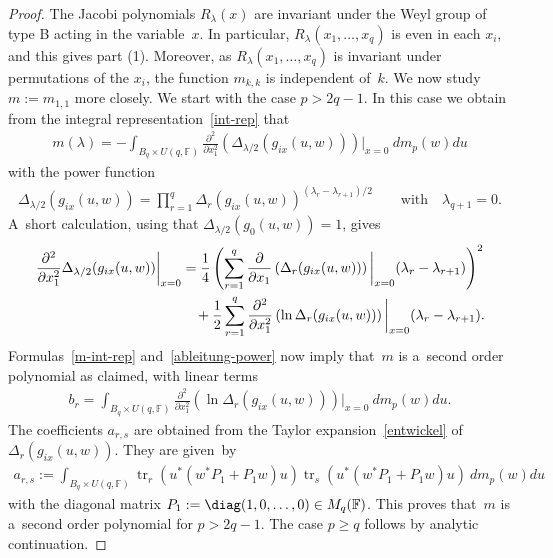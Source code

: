 \begin{proof}
The Jacobi polynomials $R_\lambda(x)$ are invariant under the Weyl group of type B acting in the variable~$x$.
In particular, $R_\lambda(x_1,\ldots,x_q)$ is even in each $x_i$, and this gives part (1).
Moreover, as $R_\lambda(x_1,\ldots,x_q)$ is invariant under permutations of the $x_i$, the function $m_{k,k}$ is
independent of~$k$.
We now study $m:=m_{1,1}$ more closely.
We start with the case $p> 2q-1$.
In this case we obtain from the integral representation~\eqref{int-rep} that
\begin{gather}
\label{m-int-rep}
m(\lambda)= -\int_{B_q\times U(q,\mathbb F)} \frac{\partial^2}{\partial x_1^2}\left(\Delta_{\lambda/2}(g_{ix}(u,w))\right)\bigg|_{x=0}\> dm_p(w)du
\end{gather}
with the power function
\begin{gather*}
\Delta_{\lambda/2}(g_{ix}(u,w)) =\prod\limits_{r=1}^q \Delta_r(g_{ix}(u,w))^{(\lambda_r-\lambda_{r+1})/2}
\qquad
\text{with}
\quad
\lambda_{q+1}=0.
\end{gather*}
A~short calculation, using that $\Delta_{\lambda/2}(g_0(u,w))=1$, gives
\begin{gather}
\frac{\partial^2}{\partial x_1^2} \Delta_{\lambda/2}(g_{ix}(u,w))\bigg|_{x=0}
=\frac{1}{4} \left(\sum\limits_{r=1}^q\frac{\partial}{\partial x_1}\left(\Delta_r(g_{ix}(u,w))\right)\bigg|_{x=0}
 (\lambda_r-\lambda_{r+1})\right)^2
\nonumber
\\
\hphantom{\frac{\partial^2}{\partial x_1^2} \Delta_{\lambda/2}(g_{ix}(u,w))\bigg|_{x=0}=}{}
+\frac{1}{2}\sum\limits_{r=1}^q \frac{\partial^2}{\partial x_1^2} \left(\ln \Delta_r(g_{ix}(u,w))\right)\bigg|_{x=0}
  (\lambda_r-\lambda_{r+1}).
\label{ableitung-power}
\end{gather}
Formulas~\eqref{m-int-rep} and~\eqref{ableitung-power} now imply that~$m$ is a~second order polynomial as claimed, with
linear terms
\begin{gather*}
b_r= \int_{B_q\times U(q,\mathbb F)} \frac{\partial^2}{\partial x_1^2} \left(\ln\Delta_r(g_{ix}(u,w))\right)\bigg|_{x=0}\> dm_p(w)du.
\end{gather*}
The coef\/f\/icients $a_{r,s}$ are obtained from the Taylor expansion~\eqref{entwickel} of $\Delta_r(g_{ix}(u,w))$. They are
given~by
\begin{gather}
\label{a_rs}
a_{r,s}:= \int_{B_q\times U(q,\mathbb F)} \operatorname{tr}_r(u^{*}(w^*P_1+ P_1  w)u) \operatorname{tr}_s(u^{*}(w^*P_1+ P_1  w)u)\>dm_p(w)du
\end{gather}
with the diagonal matrix $P_1:=\diag(1,0,\ldots,0)\in M_q(\mathbb F)$.
This proves that~$m$ is a~second order polynomial for $p>2q-1$.
The case $p\ge q$ follows by analytic continuation.


\end{proof}
